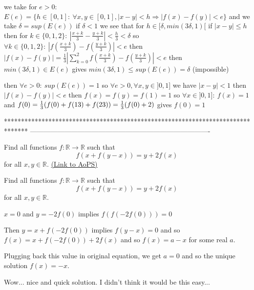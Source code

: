 \begin{solution}
	we take for $ e>0$: $ E(e)=\{h\in[0,1]: \ \forall x,y\in[0,1],|x-y|<h\Rightarrow |f(x)-f(y)|<e\}$
and we take $ \delta=sup(E(e))$
if $ \delta <1$
we see that for $ h\in[\delta,min(3\delta,1)[$
if $ |x-y|\le h$ then for $ k\in\{0,1,2\}: \ |\frac{x+k}{3}-\frac{y+k}{3}|<\frac{h}{3}<\delta$
so $ \forall k\in\{0,1,2\}: \ |f(\frac{x+k}{3})-f(\frac{y+k}{3})|<e$
then $ |f(x)-f(y)|=\frac{1}{3}|\sum_{k=0}^{2}f(\frac{x+k}{3})-f(\frac{y+k}{3})|<e$
then $ min(3\delta,1) \in E(e)$ gives $ min(3\delta,1)\le sup(E(e))=\delta$ (impossible)

then $ \forall e>0: \ sup(E(e))=1$
so $ \forall e>0,\forall x,y\in]0,1]$ we have $ |x-y|<1$ then $ |f(x)-f(y)|<e$ then $ f(x)=f(y)=f(1)=1$
so $ \forall x\in]0,1]: \ f(x)=1$ and $ f(0)=\frac{1}{3}(f(0)+f(1\/3)+f(2\/3))=\frac{1}{3}(f(0)+2)$ gives $ f(0)=1$
\end{solution}
*******************************************************************************
-------------------------------------------------------------------------------

\begin{problem}
	Find all functions $ f: \mathbb R\to\mathbb R$ such that 
\[ f(x+f(y-x))=y+2f(x)\]
for all $ x,y\in\mathbb R$.
	\flushright \href{https://artofproblemsolving.com/community/c6h184072}{(Link to AoPS)}
\end{problem}



\begin{solution}
	\begin{tcolorbox}Find all functions $ f: \mathbb R\to\mathbb R$ such that
\[ f(x + f(y - x)) = y + 2f(x)
\]
for all $ x,y\in\mathbb R$.\end{tcolorbox}

$ x=0$ and $ y=-2f(0)$ implies $ f(f(-2f(0)))=0$

Then $ y=x+f(-2f(0))$ implies $ f(y-x)=0$ and so $ f(x)=x+f(-2f(0))+2f(x)$ and so $ f(x)=a-x$ for some real $ a$.

Plugging back this value in original equation, we get $ a=0$ and so the unique solution $ \boxed{f(x)=-x}$.
\end{solution}



\begin{solution}
	Wow... nice and quick solution. I didn't think it would be this easy...
\end{solution}



